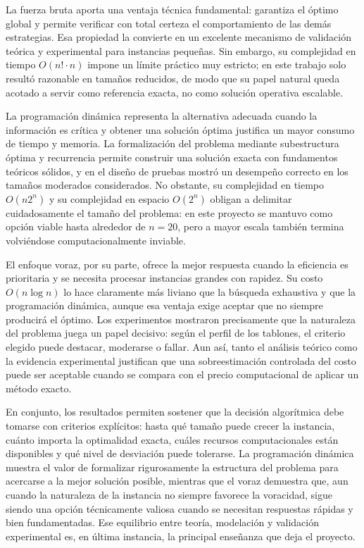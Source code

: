 \documentclass[12pt,a4paper]{article}
\begin{document}
La fuerza bruta aporta una ventaja t\'ecnica fundamental: garantiza el \'optimo global y permite verificar con total certeza el comportamiento de las dem\'as estrategias. Esa propiedad la convierte en un excelente mecanismo de validaci\'on te\'orica y experimental para instancias peque\~nas. Sin embargo, su complejidad en tiempo \(O(n! \cdot n)\) impone un l\'imite pr\'actico muy estricto; en este trabajo solo result\'o razonable en tama\~nos reducidos, de modo que su papel natural queda acotado a servir como referencia exacta, no como soluci\'on operativa escalable.

La programaci\'on din\'amica representa la alternativa adecuada cuando la informaci\'on es cr\'itica y obtener una soluci\'on \'optima justifica un mayor consumo de tiempo y memoria. La formalizaci\'on del problema mediante subestructura \'optima y recurrencia permite construir una soluci\'on exacta con fundamentos te\'oricos s\'olidos, y en el dise\~no de pruebas mostr\'o un desempe\~no correcto en los tama\~nos moderados considerados. No obstante, su complejidad en tiempo \(O(n2^n)\) y su complejidad en espacio \(O(2^n)\) obligan a delimitar cuidadosamente el tama\~no del problema: en este proyecto se mantuvo como opci\'on viable hasta alrededor de \(n=20\), pero a mayor escala tambi\'en termina volvi\'endose computacionalmente inviable.

El enfoque voraz, por su parte, ofrece la mejor respuesta cuando la eficiencia es prioritaria y se necesita procesar instancias grandes con rapidez. Su costo \(O(n \log n)\) lo hace claramente m\'as liviano que la b\'usqueda exhaustiva y que la programaci\'on din\'amica, aunque esa ventaja exige aceptar que no siempre producir\'a el \'optimo. Los experimentos mostraron precisamente que la naturaleza del problema juega un papel decisivo: seg\'un el perfil de los tablones, el criterio elegido puede destacar, moderarse o fallar. Aun as\'i, tanto el an\'alisis te\'orico como la evidencia experimental justifican que una sobreestimaci\'on controlada del costo puede ser aceptable cuando se compara con el precio computacional de aplicar un m\'etodo exacto.

En conjunto, los resultados permiten sostener que la decisi\'on algor\'itmica debe tomarse con criterios expl\'icitos: hasta qu\'e tama\~no puede crecer la instancia, cu\'anto importa la optimalidad exacta, cu\'ales recursos computacionales est\'an disponibles y qu\'e nivel de desviaci\'on puede tolerarse. La programaci\'on din\'amica muestra el valor de formalizar rigurosamente la estructura del problema para acercarse a la mejor soluci\'on posible, mientras que el voraz demuestra que, aun cuando la naturaleza de la instancia no siempre favorece la voracidad, sigue siendo una opci\'on t\'ecnicamente valiosa cuando se necesitan respuestas r\'apidas y bien fundamentadas. Ese equilibrio entre teor\'ia, modelaci\'on y validaci\'on experimental es, en \'ultima instancia, la principal ense\~nanza que deja el proyecto.
\end{document}
